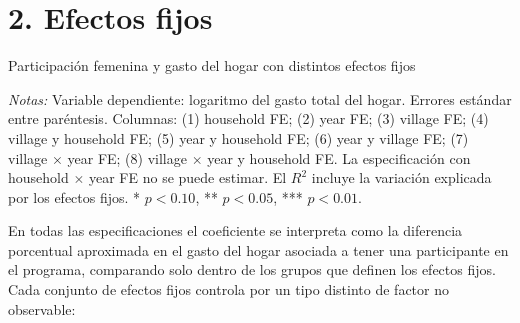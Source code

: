 \documentclass[11pt,a4paper]{article}
\newcommand{\tabla}[1]{\begin{adjustbox}{max width=\linewidth, max totalheight=0.72\textheight}\end{adjustbox}}
\newcommand{\notas}[1]{\par\vspace{0.3em}\begin{minipage}{0.92\linewidth}\footnotesize\textit{Notas:} #1\end{minipage}}
\begin{document}
\section*{2. Efectos fijos}

\begin{table}[H]\centering
\caption{Participación femenina y gasto del hogar con distintos efectos fijos}\label{tab:fe}
\small
\tabla{"../output/Tabla 2.tex"}
\notas{Variable dependiente: logaritmo del gasto total del hogar. Errores estándar entre paréntesis. Columnas: (1) household FE; (2) year FE; (3) village FE; (4) village y household FE; (5) year y household FE; (6) year y village FE; (7) village $\times$ year FE; (8) village $\times$ year y household FE. La especificación con household $\times$ year FE no se puede estimar. El $R^2$ incluye la variación explicada por los efectos fijos. * $p<0.10$, ** $p<0.05$, *** $p<0.01$.}
\end{table}

En todas las especificaciones el coeficiente se interpreta como la diferencia porcentual aproximada en el gasto del hogar asociada a tener una participante en el programa, comparando solo dentro de los grupos que definen los efectos fijos. Cada conjunto de efectos fijos controla por un tipo distinto de factor no observable:
\end{document}
